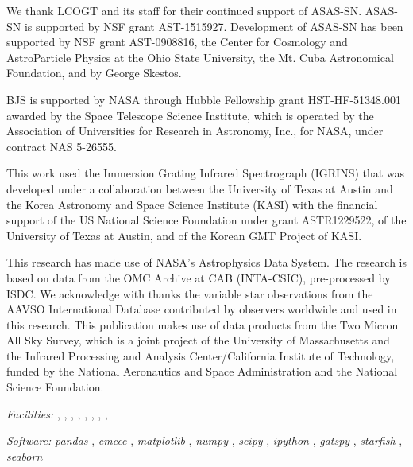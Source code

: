 \documentclass[twocolumn]{emulateapj}%
\newcommand{\project}[1]{\textsl{#1}}
\begin{document}
We thank LCOGT and its staff for their continued support of ASAS-SN. ASAS-SN is supported by NSF grant AST-1515927. Development of ASAS-SN has been supported by NSF grant AST-0908816, the Center for Cosmology and AstroParticle Physics at the Ohio State University, the Mt. Cuba Astronomical Foundation, and by George Skestos. 

BJS is supported by NASA through Hubble Fellowship grant HST-HF-51348.001 awarded by the Space Telescope Science Institute, which is operated by the Association of Universities for Research in Astronomy, Inc., for NASA, under contract NAS 5-26555.  

This work used the Immersion Grating Infrared Spectrograph (IGRINS) that was developed under a collaboration between the University of Texas at Austin and the Korea Astronomy and Space Science Institute (KASI) with the financial support of the US National Science Foundation under grant ASTR1229522, of the University of Texas at Austin, and of the Korean GMT Project of KASI.

This research has made use of NASA's Astrophysics Data System.  The research is based on data from the OMC Archive at CAB (INTA-CSIC), pre-processed by ISDC.
We acknowledge with thanks the variable star observations from the AAVSO International Database contributed by observers worldwide and used in this research.
This publication makes use of data products from the Two Micron All Sky Survey, which is a joint project of the University of Massachusetts and the Infrared Processing and Analysis Center/California Institute of Technology, funded by the National Aeronautics and Space Administration and the National Science Foundation.


{\it Facilities:} , , , , , , , , 

{\it Software: } 
 \project{pandas} \citep{mckinney10},
 \project{emcee} \citep{foreman13},
 \project{matplotlib} \citep{hunter07},
 \project{numpy} \citep{vanderwalt11},
 \project{scipy} \citep{jones01},
 \project{ipython} \citep{perez07},
 \project{gatspy} \citep{JakeVanderplas2015},
 \project{starfish} \citep{czekala15},
 \project{seaborn} \citep{waskom14}

\clearpage



\end{document}
